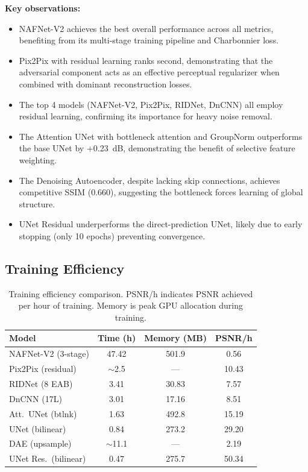 \textbf{Key observations:}
\begin{itemize}
    \item NAFNet-V2 achieves the best overall performance across all metrics, benefiting from its multi-stage training pipeline and Charbonnier loss.
    \item Pix2Pix with residual learning ranks second, demonstrating that the adversarial component acts as an effective perceptual regularizer when combined with dominant reconstruction losses.
    \item The top 4 models (NAFNet-V2, Pix2Pix, RIDNet, DnCNN) all employ residual learning, confirming its importance for heavy noise removal.
    \item The Attention UNet with bottleneck attention and GroupNorm outperforms the base UNet by +0.23~dB, demonstrating the benefit of selective feature weighting.
    \item The Denoising Autoencoder, despite lacking skip connections, achieves competitive SSIM (0.660), suggesting the bottleneck forces learning of global structure.
    \item UNet Residual underperforms the direct-prediction UNet, likely due to early stopping (only 10 epochs) preventing convergence.
\end{itemize}

\subsection{Training Efficiency}

\begin{table}[t]
\centering
\small
\setlength{\tabcolsep}{3pt}
\begin{tabular}{lccc}
\toprule
\textbf{Model} & \textbf{Time (h)} & \textbf{Memory (MB)} & \textbf{PSNR/h} \\
\midrule
NAFNet-V2 (3-stage) & 47.42 & 501.9 & 0.56 \\
Pix2Pix (residual) & $\sim$2.5 & --- & 10.43 \\
RIDNet (8 EAB) & 3.41 & 30.83 & 7.57 \\
DnCNN (17L) & 3.01 & 17.16 & 8.51 \\
Att.\ UNet (btlnk) & 1.63 & 492.8 & 15.19 \\
UNet (bilinear) & 0.84 & 273.2 & 29.20 \\
DAE (upsample) & $\sim$11.1 & --- & 2.19 \\
UNet Res.\ (bilinear) & 0.47 & 275.7 & 50.34 \\
\bottomrule
\end{tabular}
\caption{Training efficiency comparison. PSNR/h indicates PSNR achieved per hour of training. Memory is peak GPU allocation during training.}
\label{tab:efficiency}
\end{table}

